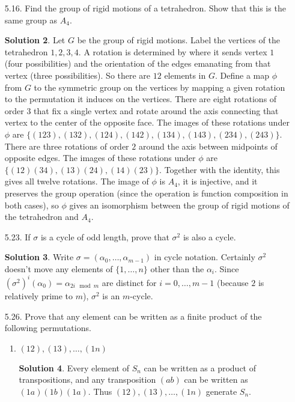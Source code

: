 \documentclass{article}
\theoremstyle{definition}
\newtheorem*{solution}{Solution}
\begin{document}
\begin{enumerate}
\begin{solution}
Therefore the orders of elements in $S_7$ are $1,2,3,4,5,6,7,10,12$ and the orders of elements in $A_7$ are $1,2,3,4,5,6,7$.
\end{solution}
\item[5.16.] Find the group of rigid motions of a tetrahedron. Show that this is the same group as $A_4$.
\begin{solution}
Let $G$ be the group of rigid motions.  Label the vertices of the tetrahedron $1,2,3,4$.  A rotation is determined by where it sends vertex $1$ (four possibilities) and the orientation of the edges emanating from that vertex (three possibilities).  So there are $12$ elements in $G$.  Define a map $\phi$ from $G$ to the symmetric group on the vertices by mapping a given rotation to the permutation it induces on the vertices.  There are eight rotations of order $3$ that fix a single vertex and rotate around the axis connecting that vertex to the center of the opposite face.  The images of these rotations under $\phi$ are $\{(123),(132),(124),(142),(134),(143),(234),(243)\}$.  There are three rotations of order $2$ around the axis between midpoints of opposite edges.  The images of these rotations under $\phi$ are $\{(12)(34),(13)(24),(14)(23)\}$.  Together with the identity, this gives all twelve rotations.  The image of $\phi$ is $A_4$, it is injective, and it preserves the group operation (since the operation is function composition in both cases), so $\phi$ gives an isomorphism between the group of rigid motions of the tetrahedron and $A_4$.
\end{solution}
\item[5.23.] If $\sigma$ is a cycle of odd length, prove that $\sigma^2$ is also a cycle.
\begin{solution}
Write $\sigma = (\alpha_0, \dots, \alpha_{m-1})$ in cycle notation.  Certainly $\sigma^2$ doesn't move any elements of $\{1, \dots, n\}$ other than the $\alpha_i$.  Since $(\sigma^2)^i(\alpha_0) = \alpha_{2i \mod m}$ are distinct for $i = 0, \dots, m-1$ (because $2$ is relatively prime to $m$), $\sigma^2$ is an $m$-cycle.
\end{solution}
\item[5.26.] Prove that any element can be written as a finite product of the following permutations.
\begin{enumerate}
\item $(12),(13),\dots,(1n)$
\begin{solution}
Every element of $S_n$ can be written as a product of transpositions, and any transposition $(ab)$ can be written as $(1a)(1b)(1a)$.  Thus $(12),(13),\dots,(1n)$ generate $S_n$.

\end{solution}
\end{enumerate}
\end{enumerate}
\end{document}
